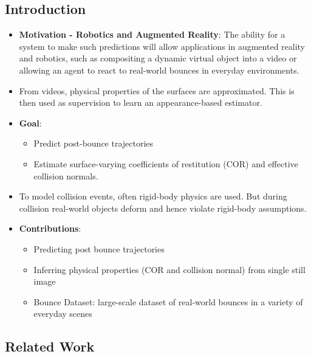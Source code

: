 \documentclass{article}
\begin{document}
    \subsection{Introduction}\label{subsec:Bounce_and_Learn_Modeling_Scene_Dynamics_with_Real_World_Bounces_(ICLR_2019,_CMU):introduction}
    \begin{itemize}
        \item \textbf{Motivation - Robotics and Augmented Reality}: The ability for a system to make such predictions will allow applications
        in augmented reality and robotics, such as compositing a dynamic virtual object into a video or
        allowing an agent to react to real-world bounces in everyday environments.
        \item From videos, physical properties of the surfaces are approximated.
        This is then used as supervision to learn an appearance-based estimator.
        \item \textbf{Goal}:
        \begin{itemize}
            \item Predict post-bounce trajectories
            \item Estimate surface-varying coefficients of restitution (COR) and effective collision normals.
        \end{itemize}
        \item To model collision events, often rigid-body physics are used.
        But during collision real-world objects deform and hence violate rigid-body assumptions.
        \item \textbf{Contributions}:
        \begin{itemize}
            \item Predicting post bounce trajectories
            \item Inferring physical properties (COR and collision normal) from single still image
            \item Bounce Dataset: large-scale dataset of real-world bounces in a variety of everyday scenes
        \end{itemize}
    \end{itemize}

    \subsection{Related Work}\label{subsec:Bounce_and_Learn_Modeling_Scene_Dynamics_with_Real_World_Bounces_(ICLR_2019,_CMU):related-work}
\end{document}
